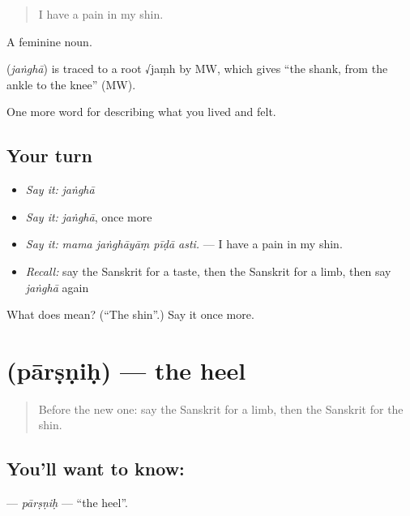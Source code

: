 \begin{quote}
I have a pain in my shin.
\end{quote}

A feminine noun.

\begin{cousinweb}
\textbf{} (\emph{jaṅghā}) is traced to a root √jaṃh by MW, which gives \textquotedblleft{}the shank, from the ankle to the knee\textquotedblright{} (MW).
\end{cousinweb}

\begin{grammarlens}[title={What you've built}]
One more word for describing what you lived and felt.
\end{grammarlens}

\subsection*{Your turn}
\begin{itemize}
\raggedright
  \item \emph{Say it:} \emph{jaṅghā}
  \item \emph{Say it:} \emph{jaṅghā}, once more
  \item \emph{Say it:} \emph{mama jaṅghāyāṃ pīḍā asti.} — I have a pain in my shin.
  \item \emph{Recall:} say the Sanskrit for a taste, then the Sanskrit for a limb, then say \emph{jaṅghā} again
\end{itemize}

\begin{tcolorbox}[breakable,colback=teal!4,colframe=teal!35!black,title={Before you move on}]
What does  mean? (\textquotedblleft{}The shin\textquotedblright{}.) Say it once more.
\end{tcolorbox}
\section[\texorpdfstring{\sk{पार्ष्णिः} (pārṣṇiḥ)}{पार्ष्णिः (pārṣṇiḥ)}]{ (pārṣṇiḥ) — the heel}

\label{lesson:SA-C473-parsnih}



\begin{quote}
Before the new one: say the Sanskrit for a limb, then the Sanskrit for the shin.
\end{quote}

\subsection*{You'll want to know: }
\textbf{} — \emph{pārṣṇiḥ} — \textquotedblleft{}the heel\textquotedblright{}.

